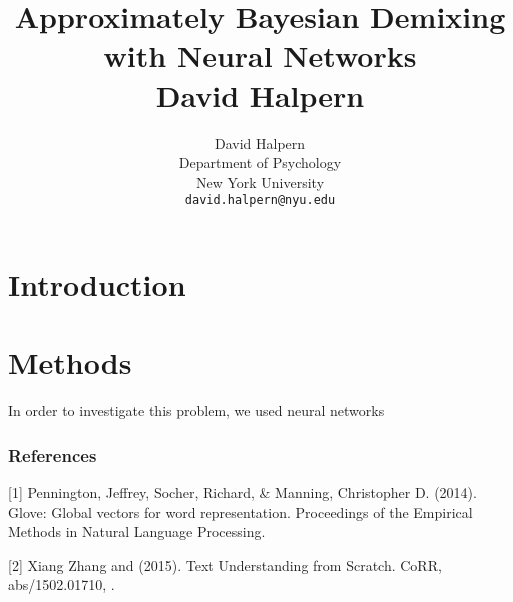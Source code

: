 \documentclass{article} %
\title{Approximately Bayesian Demixing with Neural Networks \\ David Halpern}
\author{
David Halpern\\
Department of Psychology\\
New York University\\
\texttt{david.halpern@nyu.edu} \\
}
\begin{document}
\maketitle


\section{Introduction}

\section{Methods}

In order to investigate this problem, we used neural networks

\subsubsection*{References}

\small{

[1] Pennington, Jeffrey, Socher, Richard, \& Manning, Christopher D. (2014). Glove: Global vectors for word representation. Proceedings of the Empirical Methods in Natural Language Processing.

[2] Xiang Zhang and (2015). Text Understanding from Scratch. CoRR, abs/1502.01710, .
}
\end{document}
